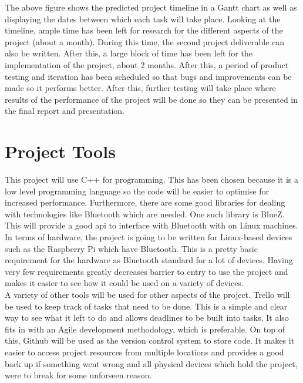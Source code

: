 \documentclass{report}
\begin{document}
\bigskip

The above figure shows the predicted project timeline in a Gantt chart as well as displaying the dates between 
which each task will take place. Looking at the timeline, ample time has been left for research for the different aspects of the 
project (about a month). During this time, the second project deliverable can also be written. After this, a large block of time 
has been left for the implementation of the project, about 2 months. After this, a period of product testing and iteration has been 
scheduled so that bugs and improvements can be made so it performs better. After this, further testing will take place where results 
of the performance of the project will be done so they can be presented in the final report and presentation. 

\section*{Project Tools}

This project will use C++ for programming. This has been chosen because it is a low level programming language 
so the code will be easier to optimise for increased performance. Furthermore, there are some good libraries 
for dealing with technologies like Bluetooth which are needed. One such library is BlueZ\cite{bluez}. This will 
provide a good api to interface with Bluetooth with on Linux machines.
\bigskip\\
In terms of hardware, the project is going to be written for Linux-based devices such as the Raspberry Pi which have 
Bluetooth. This is a pretty basic requirement for the hardware as Bluetooth standard for a lot of devices. Having 
very few requirements greatly decreases barrier to entry to use the project and makes it easier to see how it could 
be used on a variety of devices. 
\bigskip\\
A variety of other tools will be used for other aspects of the project. Trello will be used to keep track of tasks that 
need to be done. This is a simple and clear way to see what it left to do and allows deadlines to be built into tasks. It 
also fits in with an Agile development methodology, which is preferable. On top of this, Github will be used as the version 
control system to store code. It makes it easier to access project resources from multiple locations and provides a good back 
up if something went wrong and all physical devices which hold the project, were to break for some unforseen reason. 
\end{document}
